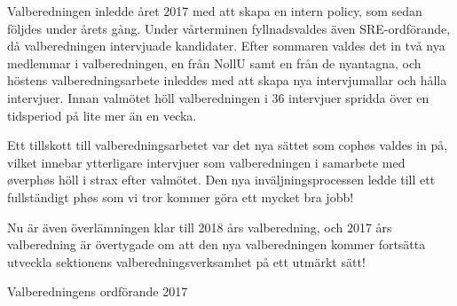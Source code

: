 \documentclass[../_main/handlingar.tex]{subfiles}
\begin{document}
Valberedningen inledde året 2017 med att skapa en intern policy, som sedan följdes under årets gång. Under vårterminen fyllnadsvaldes även SRE-ordförande, då valberedningen intervjuade kandidater. Efter sommaren valdes det in två nya medlemmar i valberedningen, en från NollU samt en från de nyantagna, och höstens valberedningsarbete inleddes med att skapa nya intervjumallar och hålla intervjuer. Innan valmötet höll valberedningen i 36 intervjuer spridda över en tidsperiod på lite mer än en vecka.

Ett tillskott till valberedningsarbetet var det nya sättet som cophøs valdes in på, vilket innebar ytterligare intervjuer som valberedningen i samarbete med øverphøs höll i strax efter valmötet. Den nya inväljningsprocessen ledde till ett fullständigt phøs som vi tror kommer göra ett mycket bra jobb!

Nu är även överlämningen klar till 2018 års valberedning, och 2017 års valberedning är övertygade om att den nya valberedningen kommer fortsätta utveckla sektionens valberedningsverksamhet på ett utmärkt sätt!

\begin{signatures}{1}
    \mvh
    \signature{Christian Benson}{Valberedningens ordförande 2017}
\end{signatures}
\end{document}

